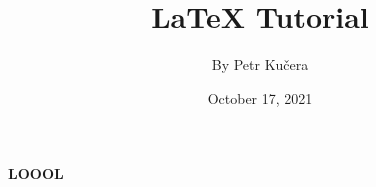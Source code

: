 \documentclass[a4paper,12pt]{article}
\begin{document}
\title{\Large{\textbf{LaTeX Tutorial}}}
\author{By Petr Kučera}
\date{October 17, 2021}

\maketitle
\newpage

\centerline{\Large{\textbf{LOOOL}}}

\blindtext[5]

\newpage

\begin{multicols}{2}
    \lipsum[1]
    \columnbreak
    \blindtext[1]
\end{multicols}
\end{document}

